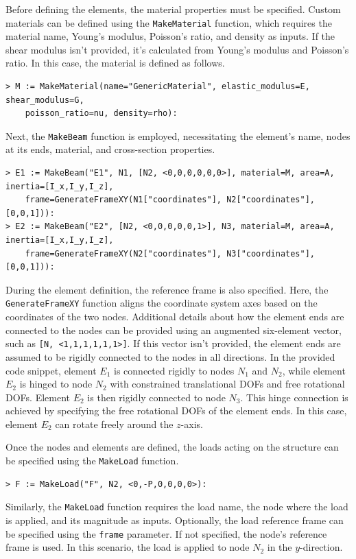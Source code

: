 Before defining the elements, the material properties must be specified. Custom materials can be defined using the \texttt{MakeMaterial} function, which requires the material name, Young's modulus, Poisson's ratio, and density as inputs. If the shear modulus isn't provided, it's calculated from Young's modulus and Poisson's ratio. In this case, the material is defined as follows.
%
\begin{verbatim}
> M := MakeMaterial(name="GenericMaterial", elastic_modulus=E, shear_modulus=G,
    poisson_ratio=nu, density=rho):
\end{verbatim}
%
Next, the \texttt{MakeBeam} function is employed, necessitating the element's name, nodes at its ends, material, and cross-section properties.
%
\begin{verbatim}
> E1 := MakeBeam("E1", N1, [N2, <0,0,0,0,0,0>], material=M, area=A, inertia=[I_x,I_y,I_z],
    frame=GenerateFrameXY(N1["coordinates"], N2["coordinates"], [0,0,1])):
> E2 := MakeBeam("E2", [N2, <0,0,0,0,0,1>], N3, material=M, area=A, inertia=[I_x,I_y,I_z],
    frame=GenerateFrameXY(N2["coordinates"], N3["coordinates"], [0,0,1])):
\end{verbatim}
%
During the element definition, the reference frame is also specified. Here, the \texttt{GenerateFrameXY} function aligns the coordinate system axes based on the coordinates of the two nodes. Additional details about how the element ends are connected to the nodes can be provided using an augmented six-element vector, such as \texttt{[N, <1,1,1,1,1,1>]}. If this vector isn't provided, the element ends are assumed to be rigidly connected to the nodes in all directions. In the provided code snippet, element $E_1$ is connected rigidly to nodes $N_1$ and $N_2$, while element $E_2$ is hinged to node $N_2$ with constrained translational \acp{DOF} and free rotational \acp{DOF}. Element $E_2$ is then rigidly connected to node $N_3$. This hinge connection is achieved by specifying the free rotational \acp{DOF} of the element ends. In this case, element $E_2$ can rotate freely around the $z$-axis.

Once the nodes and elements are defined, the loads acting on the structure can be specified using the \texttt{MakeLoad} function.
%
\begin{verbatim}
> F := MakeLoad("F", N2, <0,-P,0,0,0,0>):
\end{verbatim}
%
Similarly, the \texttt{MakeLoad} function requires the load name, the node where the load is applied, and its magnitude as inputs. Optionally, the load reference frame can be specified using the \texttt{frame} parameter. If not specified, the node's reference frame is used. In this scenario, the load is applied to node $N_2$ in the $y$-direction.

